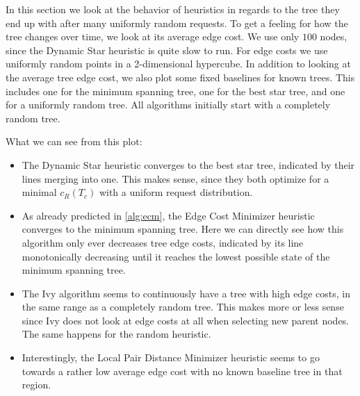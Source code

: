 \documentclass[a4paper, oneside]{discothesis}
\begin{document}
In this section we look at the behavior of heuristics in regards to the tree they end up with after many uniformly random requests. To get a feeling for how the tree changes over time, we look at its average edge cost. We use only $100$ nodes, since the Dynamic Star heuristic is quite slow to run. For edge costs we use uniformly random points in a 2-dimensional hypercube. In addition to looking at the average tree edge cost, we also plot some fixed baselines for known trees. This includes one for the minimum spanning tree, one for the best star tree, and one for a uniformly random tree. All algorithms initially start with a completely random tree.


What we can see from this plot:
\begin{itemize}
\item The Dynamic Star heuristic converges to the best star tree, indicated by their lines merging into one. This makes sense, since they both optimize for a minimal $c_R(T_c)$ with a uniform request distribution.
\item As already predicted in \autoref{alg:ecm}, the Edge Cost Minimizer heuristic converges to the minimum spanning tree. Here we can directly see how this algorithm only ever decreases tree edge costs, indicated by its line monotonically decreasing until it reaches the lowest possible state of the minimum spanning tree.
\item The Ivy algorithm seems to continuously have a tree with high edge costs, in the same range as a completely random tree. This makes more or less sense since Ivy does not look at edge costs at all when selecting new parent nodes. The same happens for the random heuristic.
\item Interestingly, the Local Pair Distance Minimizer heuristic seems to go towards a rather low average edge cost with no known baseline tree in that region.
\end{itemize}
\end{document}
